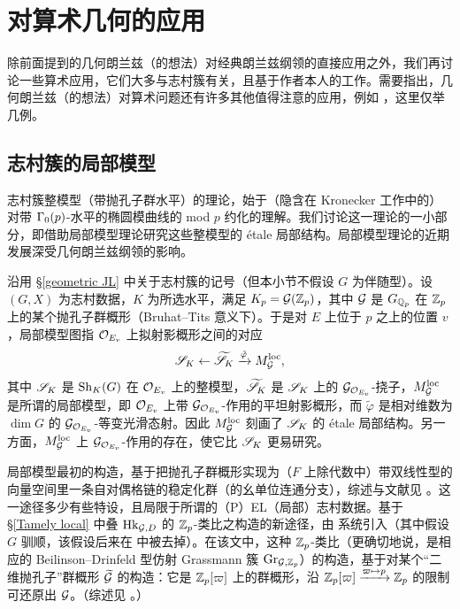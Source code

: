 
\section{对算术几何的应用}\label{Application}

除前面提到的几何朗兰兹（的想法）对经典朗兰兹纲领的直接应用之外，我们再讨论一些算术应用，它们大多与志村簇有关，且基于作者本人的工作。需要指出，几何朗兰兹（的想法）对算术问题还有许多其他值得注意的应用，例如 \cite{Gaitsgory-deJong, HNY-Kloosterman, Yun-motive-exceptional-group, Xu-Zhu-Bessel, LLLM}，这里仅举几例。

\subsection{志村簇的局部模型}\label{S: local model}

志村簇整模型（带抛孔子群水平）的理论，始于（隐含在 Kronecker 工作中的）对带 ${\Gamma}_0(p)$-水平的椭圆模曲线的 mod $p$ 约化的理解。我们讨论这一理论的一小部分，即借助局部模型理论研究这些整模型的 étale 局部结构。局部模型理论的近期发展深受几何朗兰兹纲领的影响。

沿用 \S\ref{geometric JL} 中关于志村簇的记号（但本小节不假设 $G$ 为伴随型）。设 $(G,X)$ 为志村数据，$K$ 为所选水平，满足 $K_p={\mathcal G}({\mathbb Z}_p)$，其中 ${\mathcal G}$ 是 $G_{{\mathbb Q}_p}$ 在 ${\mathbb Z}_p$ 上的某个抛孔子群概形（Bruhat--Tits 意义下）。于是对 $E$ 上位于 $p$ 之上的位置 $v$，局部模型图指 ${\mathcal O}_{E_v}$ 上拟射影概形之间的对应
\begin{equation}\label{E: local model diagram}
{\mathscr S}_K\leftarrow\widetilde{{\mathscr S}}_K\xrightarrow{\tilde\varphi} M^{{\operatorname{loc}}}_{{\mathcal G}},
\end{equation}
其中 ${\mathscr S}_K$ 是 ${\operatorname{Sh}}_K(G)$ 在 ${\mathcal O}_{E_v}$ 上的整模型，$\widetilde{{\mathscr S}}_K$ 是 ${\mathscr S}_K$ 上的 ${\mathcal G}_{{\mathcal O}_{E_v}}$-挠子，$M^{{\operatorname{loc}}}_{{\mathcal G}}$ 是所谓的局部模型，即 ${\mathcal O}_{E_v}$ 上带 ${\mathcal G}_{{\mathcal O}_{E_v}}$-作用的平坦射影概形，而 $\tilde{\varphi}$ 是相对维数为 $\dim G$ 的 ${\mathcal G}_{{\mathcal O}_{E_v}}$-等变光滑态射。因此 $M_{{\mathcal G}}^{{\operatorname{loc}}}$ 刻画了 ${\mathscr S}_K$ 的 étale 局部结构。另一方面，$M_{{\mathcal G}}^{\operatorname{loc}}$ 上 ${\mathcal G}_{{\mathcal O}_{E_v}}$-作用的存在，使它比 ${\mathscr S}_K$ 更易研究。

局部模型最初的构造，基于把抛孔子群概形实现为（$F$ 上除代数中）带双线性型的向量空间里一条自对偶格链的稳定化群（的幺单位连通分支），综述与文献见 \cite{PRS-Survey}。这一途径多少有些特设，且局限于所谓的（P）EL（局部）志村数据。基于 \S\ref{Tamely local} 中叠 ${\operatorname{Hk}}_{{\mathcal G},D}$ 的 ${\mathbb Z}_p$-类比之构造的新途径，由 \cite{Pappas-Zhu-Local-Model} 系统引入（其中假设 $G$ 驯顺，该假设后来在 \cite{Levin-Weil-Restriction, Lourenco} 中被去掉）。在该文中，这种 ${\mathbb Z}_p$-类比（更确切地说，是相应的 Beilinson--Drinfeld 型仿射 Grassmann 簇 ${\operatorname{Gr}}_{{\mathcal G},{\mathbb Z}_p}$）的构造，基于对某个“二维抛孔子”群概形 $\widetilde{{\mathcal G}}$ 的构造：它是 ${\mathbb Z}_p[\varpi]$ 上的群概形，沿 ${\mathbb Z}_p[\varpi]\xrightarrow{\varpi\mapsto p}{\mathbb Z}_p$ 的限制可还原出 ${\mathcal G}$。（综述见 \cite{Zhu-ICCM}。）

